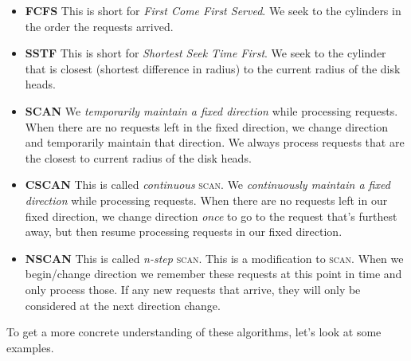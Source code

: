\begin{figure}[h]
\end{figure}

\begin{itemize}   
\renewcommand{\labelitemi}{$\Box$}
\item \textbf{FCFS} 
This is short for \textit{First Come First Served}. 
We seek to the cylinders in the order the requests arrived. 
\item \textbf{SSTF}
This is short for \textit{Shortest Seek Time First}. 
We seek to the cylinder that is closest (shortest difference in radius) 
to the current radius of the disk heads. 
\item \textbf{SCAN}
We \textit{temporarily maintain a fixed direction} while processing requests. 
When there are no requests left in the fixed direction, we change direction and 
temporarily maintain that direction. 
We always process requests that are the closest to current radius of the disk heads. 
\item \textbf{CSCAN}
This is called \textit{continuous} \textsc{scan}. 
We \textit{continuously maintain a fixed direction} while processing requests.
When there are no requests left in our fixed direction,
we change direction \textit{once} to go to the request that's furthest away, 
but then resume processing requests in our fixed direction. 
\item \textbf{NSCAN}
This is called \textit{n-step} \textsc{scan}. This is a modification to \textsc{scan}.
When we begin/change direction we remember these requests at this point in time and only
process those. If any new requests that arrive, they will only be 
considered at the next direction change. 
\end{itemize}

To get a more concrete understanding of these algorithms, let's look at some examples.

